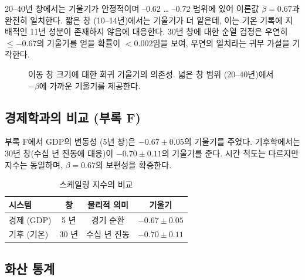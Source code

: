 \documentclass[11pt,a4paper]{article}
\newcommand{\be}{\beta}
\begin{document}
	20–40년 창에서는 기울기가 안정적이며 –0.62 … –0.72 범위에 있어 이론값 $\be = 0.67$과 완전히 일치한다. 짧은 창 (10–14년)에서는 기울기가 더 얕은데, 이는 기온 기록에 지배적인 11년 성분이 존재하지 않음에 대응한다.  
	30년 창에 대한 순열 검정은 우연히 $\le -0.67$의 기울기를 얻을 확률이 $<0.002$임을 보여, 우연의 일치라는 귀무 가설을 기각한다.
	
	\begin{figure}[htbp]
		\centering
		\caption{이동 창 크기에 대한 회귀 기울기의 의존성. 넓은 창 범위 (20–40년)에서 $-\be$에 가까운 기울기를 제공한다.}
		\label{fig:slope_vs_window}
	\end{figure}
	
	\subsection{경제학과의 비교 (부록 F)}
	
	부록 F에서 GDP의 변동성 (5년 창)은 $-0.67 \pm 0.05$의 기울기를 주었다. 기후학에서는 30년 창(수십 년 진동에 대응)이 $-0.70 \pm 0.11$의 기울기를 준다. 시간 척도는 다르지만 지수는 동일하며, $\be = 0.67$의 보편성을 확증한다.
	
	\begin{table}[htbp]
		\centering
		\caption{스케일링 지수의 비교}
		\label{tab:compare}
		\begin{tabular}{@{}lccc@{}}
			\toprule
			시스템 & 창 & 물리적 의미 & 기울기 \\
			\midrule
			경제 (GDP) & 5 년 & 경기 순환 & $-0.67 \pm 0.05$ \\
			기후 (기온) & 30 년 & 수십 년 진동 & $-0.70 \pm 0.11$ \\
			\bottomrule
		\end{tabular}
	\end{table}
	
	\subsection{화산 통계}
	
\end{document}
